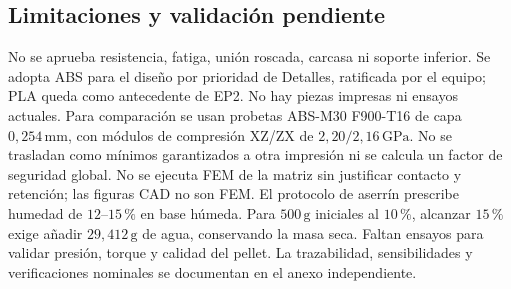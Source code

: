 \subsection{Limitaciones y validación pendiente}
No se aprueba resistencia, fatiga, unión roscada, carcasa ni soporte inferior.
Se adopta ABS para el diseño por prioridad de Detalles, ratificada por el equipo;
PLA queda como antecedente de EP2. No hay piezas impresas ni ensayos actuales.
Para comparación se usan probetas ABS-M30 F900-T16 de capa $0,254\,\mathrm{mm}$,
con módulos de compresión XZ/ZX de $2,20/2,16\,\mathrm{GPa}$\parencite{stratasys_abs_m30_0222a}.
No se trasladan como mínimos garantizados a otra impresión ni se calcula un factor de seguridad global.
No se ejecuta FEM de la matriz sin justificar contacto y retención; las figuras CAD no son FEM.
El protocolo de aserrín prescribe humedad de $12$--$15\,\%$ en base húmeda.
Para $500\,\mathrm{g}$ iniciales al $10\,\%$, alcanzar $15\,\%$ exige añadir $29,412\,\mathrm{g}$
de agua, conservando la masa seca. Faltan ensayos para validar presión, torque y calidad del pellet.
La trazabilidad, sensibilidades y verificaciones nominales se documentan en el anexo independiente.
